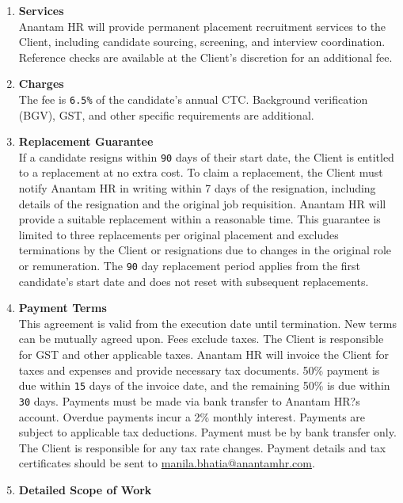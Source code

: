 \documentclass{article}
\begin{document}
\begin{enumerate}[label=\arabic{enumi}.]
    \item \textbf{Services}\\
        Anantam HR will provide permanent placement recruitment services to the Client, including candidate sourcing, screening, and interview coordination. Reference checks are available at the Client's discretion for an additional fee.
    \item \textbf{Charges}\\
        The fee is \texttt{6.5\%} of the candidate's annual CTC. Background verification (BGV), GST, and other specific requirements are additional.
    \item \textbf{Replacement Guarantee}\\
        If a candidate resigns within \texttt{90} days of their start date, the Client is entitled to a replacement at no extra cost. To claim a replacement, the Client must notify Anantam HR in writing within 7 days of the resignation, including details of the resignation and the original job requisition. Anantam HR will provide a suitable replacement within a reasonable time. This guarantee is limited to three replacements per original placement and excludes terminations by the Client or resignations due to changes in the original role or remuneration. The \texttt{90} day replacement period applies from the first candidate's start date and does not reset with subsequent replacements.
    \item \textbf{Payment Terms}\\
        This agreement is valid from the execution date until termination. New terms can be mutually agreed upon. Fees exclude taxes. The Client is responsible for GST and other applicable taxes. Anantam HR will invoice the Client for taxes and expenses and provide necessary tax documents. 50\% payment is due within \texttt{15} days of the invoice date, and the remaining 50\% is due within \texttt{30} days. Payments must be made via bank transfer to Anantam HR?s account. Overdue payments incur a 2\% monthly interest. Payments are subject to applicable tax deductions. Payment must be by bank transfer only. The Client is responsible for any tax rate changes. Payment details and tax certificates should be sent to \href{mailto:[manila.bhatia@anantamhr.com]}{manila.bhatia@anantamhr.com}.
    \item \textbf{Detailed Scope of Work}\\

\end{enumerate}
\end{document}
